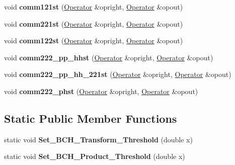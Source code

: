 \begin{DoxyCompactItemize}
\item 
\hypertarget{classOperator_ad6cf6f66211d0893ef0784cde14445f0}{void {\bfseries comm121st} (\hyperlink{classOperator}{Operator} \&opright, \hyperlink{classOperator}{Operator} \&opout)}\label{classOperator_ad6cf6f66211d0893ef0784cde14445f0}

\item 
\hypertarget{classOperator_a4d68427f2033c9e25c46674e555e05d2}{void {\bfseries comm221st} (\hyperlink{classOperator}{Operator} \&opright, \hyperlink{classOperator}{Operator} \&opout)}\label{classOperator_a4d68427f2033c9e25c46674e555e05d2}

\item 
\hypertarget{classOperator_ac7b9d8a707c3cfc953f070967704835e}{void {\bfseries comm122st} (\hyperlink{classOperator}{Operator} \&opright, \hyperlink{classOperator}{Operator} \&opout)}\label{classOperator_ac7b9d8a707c3cfc953f070967704835e}

\item 
\hypertarget{classOperator_a6b1dec40442bf3f9ebe0dbc52bc2d241}{void {\bfseries comm222\-\_\-pp\-\_\-hhst} (\hyperlink{classOperator}{Operator} \&opright, \hyperlink{classOperator}{Operator} \&opout)}\label{classOperator_a6b1dec40442bf3f9ebe0dbc52bc2d241}

\item 
\hypertarget{classOperator_a850ad8c78ae948a6243e6041eaee5b64}{void {\bfseries comm222\-\_\-pp\-\_\-hh\-\_\-221st} (\hyperlink{classOperator}{Operator} \&opright, \hyperlink{classOperator}{Operator} \&opout)}\label{classOperator_a850ad8c78ae948a6243e6041eaee5b64}

\item 
\hypertarget{classOperator_a0f3ee31f13fff9cb88e0e107e2acdf8a}{void {\bfseries comm222\-\_\-phst} (\hyperlink{classOperator}{Operator} \&opright, \hyperlink{classOperator}{Operator} \&opout)}\label{classOperator_a0f3ee31f13fff9cb88e0e107e2acdf8a}

\end{DoxyCompactItemize}
\subsection*{Static Public Member Functions}
\begin{DoxyCompactItemize}
\item 
\hypertarget{classOperator_a6f505221635444cb0b489b9ac600fd61}{static void {\bfseries Set\-\_\-\-B\-C\-H\-\_\-\-Transform\-\_\-\-Threshold} (double x)}\label{classOperator_a6f505221635444cb0b489b9ac600fd61}

\item 
\hypertarget{classOperator_a2c42843a1a557f2ab568d106e8fd23e8}{static void {\bfseries Set\-\_\-\-B\-C\-H\-\_\-\-Product\-\_\-\-Threshold} (double x)}\label{classOperator_a2c42843a1a557f2ab568d106e8fd23e8}

\end{DoxyCompactItemize}
